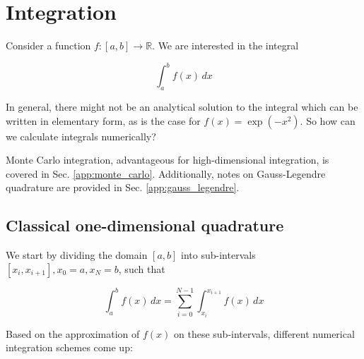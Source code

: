 \section{Integration}
\thispagestyle{plain}

Consider a function $f: [a,b] \to \mathbb{R}$. We are
interested in the integral

\begin{equation}
    \int_a^b f(x) \, dx
\end{equation}

In general, there might not be an analytical
solution to the integral which can be written
in elementary form, as is the case for
$f(x) = \exp{(-x^2)}$. So how can we calculate
integrals numerically?

Monte Carlo integration,
advantageous for high-dimensional integration,
is covered in Sec. \ref{app:monte_carlo}. Additionally,
notes on Gauss-Legendre quadrature are provided in Sec. \ref{app:gauss_legendre}.

\subsection{Classical one-dimensional quadrature}


We start by dividing the domain $[a,b]$ into sub-intervals
$[x_i,x_{i+1}], x_0 = a, x_N = b$, such that

\begin{equation}
    \int_a^b f(x) \, dx = \sum_{i=0}^{N-1} \int_{x_i}^{x_{i+1}} f(x) \, dx
\end{equation}

Based on the approximation of $f(x)$ on these sub-intervals, different
numerical integration schemes come up:

